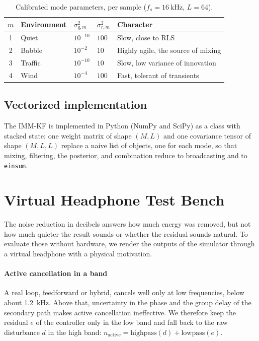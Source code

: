 \documentclass[conference]{IEEEtran}
\begin{document}
\begin{table}[t]
\caption{Calibrated mode parameters, per sample ($f_s=\SI{16}{\kilo\hertz}$, $L=64$).}
\label{tab:modes}
\centering
\renewcommand{\arraystretch}{1.15}
\begin{tabular}{@{}clllp{3.0cm}@{}}
\toprule
$m$ & Environment & $\sigma_{q,m}^2$ & $\sigma_{r,m}^2$ & Character \\
\midrule
1 & Quiet   & $10^{-10}$ & $100$ & Slow, close to RLS \\
2 & Babble  & $10^{-2}$  & $10$  & Highly agile, the source of mixing \\
3 & Traffic & $10^{-10}$ & $10$  & Slow, low variance of innovation \\
4 & Wind    & $10^{-4}$  & $100$ & Fast, tolerant of transients \\
\bottomrule
\end{tabular}
\end{table}

\subsection{Vectorized implementation}
The IMM-KF is implemented in Python (NumPy and SciPy) as a class with stacked state:
one weight matrix of shape $(M,L)$ and one covariance tensor of shape $(M,L,L)$
replace a naive list of objects, one for each mode, so that mixing, filtering, the
posterior, and combination reduce to broadcasting and to \texttt{einsum}.

\section{Virtual Headphone Test Bench}
\label{sec:bench}

The noise reduction in decibels answers how much energy was removed, but not how
much quieter the result sounds or whether the residual sounds natural. To evaluate
those without hardware, we render the outputs of the simulator through a virtual
headphone with a physical motivation.

\paragraph{Active cancellation in a band} A real loop, feedforward or hybrid,
cancels well only at low frequencies, below about \SI{1.2}{\kilo\hertz}. Above that,
uncertainty in the phase and the group delay of the secondary path makes active
cancellation ineffective. We therefore keep the residual $e$ of the controller only
in the low band and fall back to the raw disturbance $d$ in the high band:
$n_{\mathrm{active}} = \mathrm{highpass}(d) + \mathrm{lowpass}(e)$.
\end{document}
